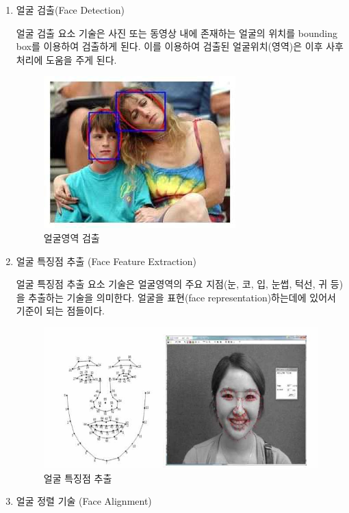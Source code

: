 \documentclass{oblivoir}
\begin{document}
                        
\begin{enumerate}%
    \item  얼굴 검출(Face Detection)

    얼굴 검출 요소 기술은 사진 또는 동영상 내에 존재하는 얼굴의 위치를 bounding box를 이용하여 검출하게 된다. 이를 이용하여 검출된 얼굴위치(영역)은 이후 사후처리에 도움을 주게 된다.

    \begin{figure}[h!]
        \centering
        \includegraphics{pic/chp1/img398}
        \caption{얼굴영역 검출\cite{reference1}}
    \end{figure}
            
    \item 얼굴 특징점 추출 (Face Feature Extraction)

    얼굴 특징점 추출 요소 기술은 얼굴영역의 주요 지점(눈, 코, 입, 눈썹, 턱선, 귀 등)을 추출하는 기술을 의미한다. 얼굴을 표현(face representation)하는데에 있어서 기준이 되는 점들이다.
    \begin{figure}[h!]
        \centering
        \includegraphics{pic/chp1/img399}
        \caption{얼굴 특징점 추출\cite{reference2}}
    \end{figure}

    \item 얼굴 정렬 기술 (Face Alignment)


\end{enumerate}
\end{document}
